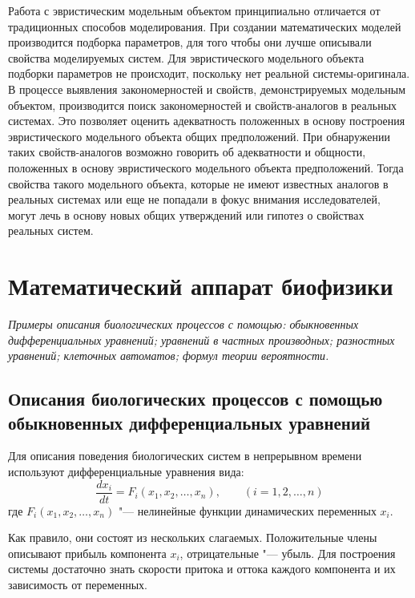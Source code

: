 \documentclass[12pt,a4paper,oneside]{book}
\begin{document}
Работа с эвристическим модельным объектом принципиально отличается от традиционных способов моделирования. При создании математических моделей производится подборка параметров, для того чтобы они лучше описывали свойства моделируемых систем. Для эвристического модельного объекта подборки параметров не происходит, поскольку нет реальной системы-оригинала. В процессе выявления закономерностей и свойств, демонстрируемых модельным объектом, производится поиск закономерностей и свойств-аналогов в реальных системах. Это позволяет оценить адекватность положенных в основу построения эвристического модельного объекта общих предположений. При обнаружении таких свойств-аналогов возможно говорить об адекватности и общности, положенных в основу эвристического модельного объекта предположений. Тогда свойства такого модельного объекта, которые не имеют известных аналогов в реальных системах или еще не попадали в фокус внимания исследователей, могут лечь в основу новых общих утверждений или гипотез о свойствах реальных систем.



\newpage
\section{Математический аппарат биофизики}
{\it Примеры описания биологических процессов с помощью: обыкновенных дифференциальных уравнений; уравнений в частных производных; разностных уравнений; клеточных автоматов; формул теории вероятности.}

\subsection{Описания биологических процессов с помощью обыкновенных дифференциальных уравнений}

Для описания поведения биологических систем в непрерывном времени используют дифференциальные уравнения вида:
\begin{equation}
	\label{general}
	\frac{dx_i}{dt} = F_i(x_1, x_2, \dots, x_n), \qquad (i = 1, 2, \dots, n)
\end{equation}
где $F_i (x_1, x_2, \dots, x_n)$ "--- нелинейные функции динамических переменных $x_i$.

Как правило, они состоят из нескольких слагаемых. Положительные члены описывают прибыль компонента $x_i$, отрицательные "--- убыль. Для построения системы достаточно знать скорости притока и оттока каждого компонента и их зависимость от переменных.
\end{document}
